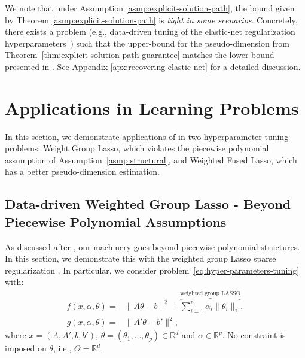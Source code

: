 \documentclass{article}
\theoremstyle{plain}
\theoremstyle{definition}
\theoremstyle{remark}
\newcommand*{\RR}{\mathbb{R}}
\begin{document}
We note that under Assumption \ref{asmp:explicit-solution-path}, the bound given by Theorem \ref{asmp:explicit-solution-path} is \textit{tight in some scenarios}. Concretely, there exists a problem (e.g., data-driven tuning of the elastic-net regularization hyperparameters~\citep{balcan2023new}) such that the upper-bound for the pseudo-dimension from Theorem~\ref{thm:explicit-solution-path-guarantee} matches the lower-bound presented in \citet{balcan2023new}. See Appendix \ref{apx:recovering-elastic-net} for a detailed discussion.

\section{Applications in Learning Problems} \label{sec:applications}
In this section, we demonstrate applications of  in two hyperparameter tuning problems: Weight Group Lasso, which violates the piecewise polynomial assumption of Assumption~\ref{asmp:structural}, and Weighted Fused Lasso, which has a better pseudo-dimension estimation.

\subsection{Data-driven Weighted Group Lasso - Beyond Piecewise Polynomial Assumptions}
\label{sec:weighted-group-lasso}
As discussed after , our machinery goes beyond piecewise polynomial structures. In this section, we demonstrate this with the weighted group Lasso sparse regularization \cite{yuan2006model}. In particular, we consider problem~\eqref{eq:hyper-parameters-tuning} with:
\begin{equation}
    \label{eq:group-lasso}
	\begin{aligned}
		f(x, \alpha, \theta) = & \|A\theta - b\|^2 + \overbrace{\sum_{i = 1}^p \alpha_i \|\theta_i\|_2}^{\text{weighted group LASSO}}, \\
		g(x, \alpha, \theta) = & \|A'\theta - b'\|^2,
	\end{aligned}
\end{equation}
where $x = (A, A', b, b')$, $\theta = (\theta_1, \ldots, \theta_p) \in \RR^d$ and $\alpha \in \RR^p$. No constraint is imposed on $\theta$, i.e., $\Theta = \RR^d$.
\end{document}
